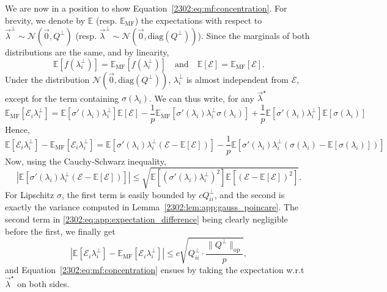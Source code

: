 We are now in a position to show Equation~\eqref{2302:eq:mf:concentration}. For brevity, we denote by $\mathbb E$ (resp. $\mathbb E_{\text{MF}}$) the expectations with respect to $\vec\lambda^\bot \sim \mathcal N(\vec{0}, Q^\bot)$ (resp. $\vec\lambda^\bot \sim \mathcal N(\vec{0}, \mathrm{diag}(Q^\bot))$). Since the marginals of both distributions are the same, and by linearity,
\[ \mathbb E\left[f(\lambda^\bot_i)\right] =  \mathbb E_{\text{MF}}\left[f(\lambda^\bot_i)\right] \quad \text{and} \quad  \mathbb E\left[\mathcal E\right] =  \mathbb E_{\text{MF}}\left[\mathcal E\right]. \]
Under the distribution $\mathcal N(\vec{0}, \mathrm{diag}(Q^\bot))$, $\lambda_i^\bot$ is almost independent from $\mathcal E$, except for the term containing $\sigma(\lambda_i)$. We can thus write, for any $\vec{\lambda}^\star$
\[ \mathbb E_{\text{MF}}\left[\mathcal E_i \lambda_i^\bot \right] = \mathbb E \left[ \sigma'(\lambda_i)\lambda_i^\bot \right] \mathbb E\left[ \mathcal E \right] - \frac1p\mathbb E_{\text{MF}}\left[ \sigma'(\lambda_i)\lambda_i^\bot \sigma(\lambda_i) \right] + \frac1p \mathbb E\left[\sigma'(\lambda_i)\lambda_i^\bot \right] \mathbb E\left[\sigma(\lambda_i) \right]  \]
Hence,
\begin{equation}\label{2302:eq:app:expectation_difference}
\mathbb E\left[\mathcal E_i \lambda_i^\bot \right] - \mathbb E_{\text{MF}}\left[\mathcal E_i \lambda_i^\bot \right] = \mathbb E \left[ \sigma'(\lambda_i)\lambda_i^\bot \left(\mathcal E - \mathbb E\left[ \mathcal E \right]\right)\right]  - \frac1p\mathbb E\left[ \sigma'(\lambda_i)\lambda_i^\bot \left(\sigma(\lambda_i) - \mathbb E[\sigma(\lambda_i)] \right)\right] 
\end{equation} 
Now, using the Cauchy-Schwarz inequality,
\[  \left|\mathbb E \left[ \sigma'(\lambda_i)\lambda_i^\bot \left(\mathcal E - \mathbb E\left[ \mathcal E \right]\right)\right]\right| \leq \sqrt{\mathbb E \left[ \left(\sigma'(\lambda_i)\lambda_i^\bot\right)^2\right]\mathbb E \left[\left(\mathcal E - \mathbb E\left[ \mathcal E \right]\right)^2\right]}.\]
For Lipschitz $\sigma$, the first term is easily bounded by $c  Q_{ii}^\bot$, and the second is exactly the variance computed in Lemma~\ref{2302:lem:app:gauss_poincare}. The second term in \eqref{2302:eq:app:expectation_difference} being clearly negligible before the first, we finally get
\begin{equation}
    \left|\mathbb E\left[\mathcal E_i \lambda_i^\bot \right] - \mathbb E_{\text{MF}}\left[\mathcal E_i \lambda_i^\bot \right]\right| \leq c  \sqrt{Q_{ii}^\bot \cdot \frac{\lVert Q^\bot \rVert_{\mathrm{op}}}{p}},
\end{equation}
and Equation~\eqref{2302:eq:mf:concentration} ensues by taking the expectation w.r.t $\vec{\lambda}^\star$ on both sides.

